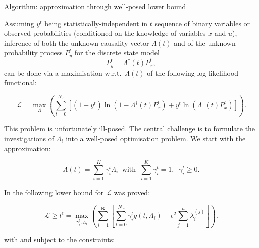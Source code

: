 \documentclass[final,hyperref={pdfpagelabels=false}]{beamer}
\begin{document}
\begin{frame}[t]
\begin{columns}[t]
\begin{column}{.48\textwidth}



\begin{block}{Algorithm:  approximation through well-posed lower bound}

Assuming $y^t$ being statistically-independent in $t$  sequence of binary variables or observed probabilities 
(conditioned on the knowledge of variables $x$ and $u$), inference of both the unknown causality vector $\Lambda(t)$ 
and of the unknown probability process $P_y^t$ for the discrete state model  
\begin{displaymath}
P_y^t = \Lambda^{\dagger}(t)P^t_x,
\end{displaymath}
can be done via a maximisation 
w.r.t.~$\Lambda(t)$ of the following log-likelihood functional:

\begin{equation}
\label{eq:loglik}
\mathcal{L}=\max_{\Lambda} \left( \sum_{t=0}^{N_T}\left[\left(1-y^t\right)\ln\left(1-\Lambda^{\dagger}(t)P_x^t\right)
+y^t\ln\left(\Lambda^{\dagger}(t)P^t_x\right)\right] \right).
\end{equation}

\noindent This problem is unfortunately ill-posed.  The central challenge is to formulate the investigations of $\Lambda_i$ 
into a well-posed optimisation problem.  We start with the approximation:

$$\Lambda (t) = \sum_{i=1}^{K} \gamma_i^t \Lambda_i \;\; \mbox{with} \;\; \sum_{i=1}^K \gamma_i^t = 1, \;\; \gamma_i^t \ge 0.$$

\noindent In \cite{horenko_pnas_2014} the following lower bound for $\mathcal{L}$ was proved:

\begin{equation}
\label{eq:loglik_lb}
\mathcal{L} \ge l^\epsilon= \max_{\gamma_i^t,\Lambda_i} \left( \sum_{i=1}^{\mathbf{K}}\left[\sum_{t=0}^{N_T}\gamma^t_i g\left(t,\Lambda_i\right)-\epsilon^2\sum_{j=1}^n\lambda_{i}^{(j)}\right] \right).
\end{equation}

\noindent with 
and subject to the constraints:


\end{block}
\end{column}
\end{columns}
\end{frame}
\end{document}
